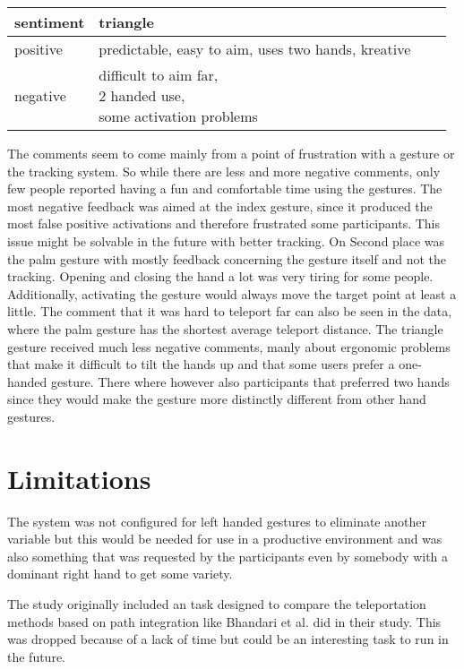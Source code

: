 \begin{table}[]
\begin{tabular}{llll}
\hline
sentiment &
    triangle \\ \hline
\multicolumn{1}{|l|}{positive} &
    \multicolumn{1}{l|}{predictable, easy to aim, uses two hands, kreative} \\ \hline
negative &
    \makecell{difficult to aim far,\\ 2 handed use,\\ some activation problems} \\ \hline
\end{tabular}%
\label{tbl:interview3}
\end{table}

The comments seem to come mainly from a point of frustration with a gesture or the tracking system. So while there are less and more negative comments, only few people reported having a fun and comfortable time using the gestures. The most negative feedback was aimed at the index gesture, since it produced the most false positive activations and therefore frustrated some participants. This issue might be solvable in the future with better tracking. On Second place was the palm gesture with mostly feedback concerning the gesture itself and not the tracking. Opening and closing the hand a lot was very tiring for some people. Additionally, activating the gesture would always move the target point at least a little. The comment that it was hard to teleport far can also be seen in the data, where the palm gesture has the shortest average teleport distance. The triangle gesture received much less negative comments, manly about ergonomic problems that make it difficult to tilt the hands up and that some users prefer a one-handed gesture. There where however also participants that preferred two hands since they would make the gesture more distinctly different from other hand gestures. 


\section{Limitations}
The system was not configured for left handed gestures to eliminate another variable but this would be needed for use in a productive environment and was also something that was requested by the participants even by somebody with a dominant right hand to get some variety. 

The study originally included an task designed to compare the teleportation methods based on path integration like Bhandari et al. \cite{Bhandari} did in their study. This was dropped because of a lack of time but could be an interesting task to run in the future.
